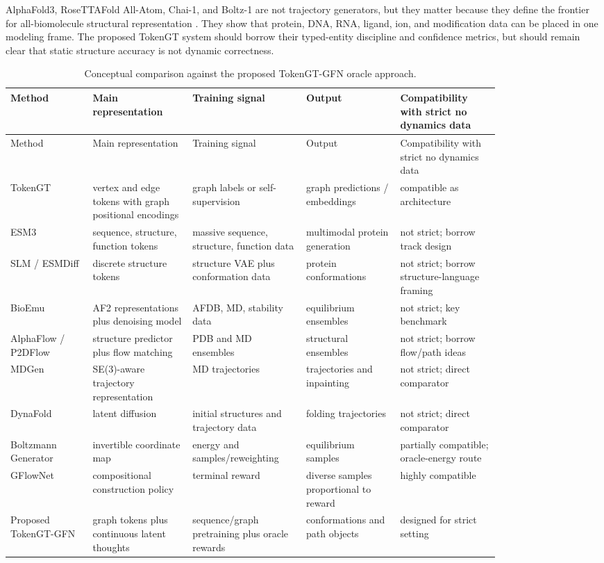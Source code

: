 \documentclass[11pt]{article}
\begin{document}
AlphaFold3, RoseTTAFold All-Atom, Chai-1, and Boltz-1 are not trajectory generators, but they matter because they define the frontier for all-biomolecule structural representation \cite{abramson2024af3,krishna2024rfaa,chaiteam2024chai1,wohlwend2024boltz1}. They show that protein, DNA, RNA, ligand, ion, and modification data can be placed in one modeling frame. The proposed TokenGT system should borrow their typed-entity discipline and confidence metrics, but should remain clear that static structure accuracy is not dynamic correctness.

\begingroup
\small
\setlength{\tabcolsep}{3pt}
\begin{longtable}{p{0.14\linewidth}p{0.17\linewidth}p{0.18\linewidth}p{0.16\linewidth}p{0.17\linewidth}}
\caption{Conceptual comparison against the proposed TokenGT-GFN oracle approach.}\\
\toprule
Method & Main representation & Training signal & Output & Compatibility with strict no dynamics data\\
\midrule
\endfirsthead
\toprule
Method & Main representation & Training signal & Output & Compatibility with strict no dynamics data\\
\midrule
\endhead
TokenGT & vertex and edge tokens with graph positional encodings & graph labels or self-supervision & graph predictions / embeddings & compatible as architecture\\
ESM3 & sequence, structure, function tokens & massive sequence, structure, function data & multimodal protein generation & not strict; borrow track design\\
SLM / ESMDiff & discrete structure tokens & structure VAE plus conformation data & protein conformations & not strict; borrow structure-language framing\\
BioEmu & AF2 representations plus denoising model & AFDB, MD, stability data & equilibrium ensembles & not strict; key benchmark\\
AlphaFlow / P2DFlow & structure predictor plus flow matching & PDB and MD ensembles & structural ensembles & not strict; borrow flow/path ideas\\
MDGen & SE(3)-aware trajectory representation & MD trajectories & trajectories and inpainting & not strict; direct comparator\\
DynaFold & latent diffusion & initial structures and trajectory data & folding trajectories & not strict; direct comparator\\
Boltzmann Generator & invertible coordinate map & energy and samples/reweighting & equilibrium samples & partially compatible; oracle-energy route\\
GFlowNet & compositional construction policy & terminal reward & diverse samples proportional to reward & highly compatible\\
Proposed TokenGT-GFN & graph tokens plus continuous latent thoughts & sequence/graph pretraining plus oracle rewards & conformations and path objects & designed for strict setting\\
\bottomrule
\end{longtable}
\endgroup
\end{document}

